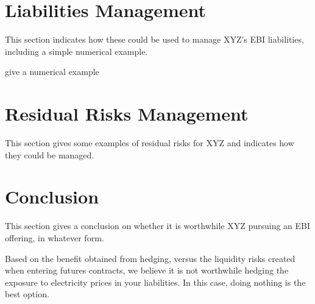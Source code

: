 \documentclass[12pt]{article}
\begin{document}
\section{Liabilities Management}
\begin{flushleft}
This section indicates how these could be used to manage XYZ’s EBI liabilities, including a simple numerical example. \par
\end{flushleft}

give a numerical example
\frameboxend
\newpage

\section{Residual Risks Management}
\begin{flushleft}
This section gives some examples of residual risks for XYZ and indicates how they could be managed. 
\end{flushleft}
\newpage

\section{Conclusion}
\begin{flushleft}
This section gives a conclusion on whether it is worthwhile XYZ pursuing an EBI offering, in whatever form. 

Based on the benefit obtained from hedging, versus the liquidity risks created when
entering futures contracts, we believe it is not worthwhile hedging the exposure to electricity prices in your liabilities. In this case, doing nothing is the best option.
\end{flushleft}
\newpage

\printbibliography[heading=bibintoc]
\end{document}
